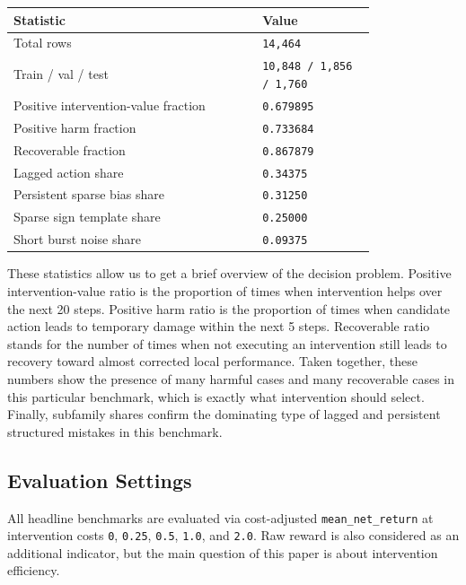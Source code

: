 \documentclass[11pt]{article}
\begin{document}
\begin{table}[h]
\centering
\small
\begin{tabular}{>{\raggedright\arraybackslash}p{0.55\linewidth}>{\raggedright\arraybackslash}p{0.25\linewidth}}
\toprule
Statistic & Value \\
\midrule
Total rows & \texttt{14,464} \\
Train / val / test & \texttt{10,848 / 1,856 / 1,760} \\
Positive intervention-value fraction & \texttt{0.679895} \\
Positive harm fraction & \texttt{0.733684} \\
Recoverable fraction & \texttt{0.867879} \\
Lagged action share & \texttt{0.34375} \\
Persistent sparse bias share & \texttt{0.31250} \\
Sparse sign template share & \texttt{0.25000} \\
Short burst noise share & \texttt{0.09375} \\
\bottomrule
\end{tabular}
\end{table}

These statistics allow us to get a brief overview of the decision problem. Positive intervention-value ratio is the proportion of times when intervention helps over the next 20 steps. Positive harm ratio is the proportion of times when candidate action leads to temporary damage within the next 5 steps. Recoverable ratio stands for the number of times when not executing an intervention still leads to recovery toward almost corrected local performance. Taken together, these numbers show the presence of many harmful cases and many recoverable cases in this particular benchmark, which is exactly what intervention should select. Finally, subfamily shares confirm the dominating type of lagged and persistent structured mistakes in this benchmark.

\subsection*{Evaluation Settings}

All headline benchmarks are evaluated via cost-adjusted \texttt{mean\_net\_return} at intervention costs \texttt{0}, \texttt{0.25}, \texttt{0.5}, \texttt{1.0}, and \texttt{2.0}. Raw reward is also considered as an additional indicator, but the main question of this paper is about intervention efficiency.
\end{document}
